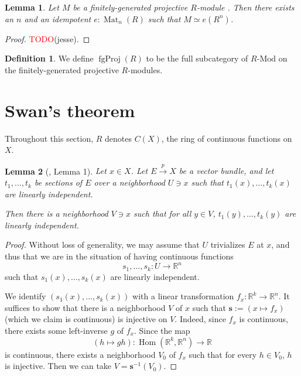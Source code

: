 \documentclass[11pt]{article}
\newcommand{\R}{\mathbb{R}}
\newcommand{\remph}[1]{\textcolor{red}{#1}}
\newcommand{\TODO}{\remph{TODO}}
\newcommand{\Hom}{\operatorname{Hom}}
\newcommand{\Mat}{\operatorname{Mat}}
\newcommand{\fgProj}{\operatorname{fgProj}}
\theoremstyle{plain}
\newtheorem{lemma}{Lemma}[section]
\theoremstyle{definition}
\newtheorem{definition}{Definition}[section]
\begin{document}
\begin{lemma} \label{lemma-fg-projective-idempotent}
  Let \(M\) be a finitely-generated projective \(R\)-module . Then there exists an \(n\) and an idempotent \(e : \Mat_n(R)\) such that \(M \simeq e(R^n)\).
\end{lemma}

\begin{proof}
  \TODO(jesse).
\end{proof}

\begin{definition} \label{def-category-projective-modules}
  We define \(\fgProj(R)\) to be the full subcategory of \(R\text{-Mod}\) on the finitely-generated projective \(R\)-modules.
\end{definition}

\section{Swan's theorem}

Throughout this section, \(R\) denotes \(C(X)\), the ring of continuous functions on \(X\).

\begin{lemma}[\cite{swan1962vector}, Lemma 1]\label{lemma-1}
  Let \(x \in X\). Let \(E \overset{p}{\to} X\) be a vector bundle, and let \(t_1, \dots, t_k\) be sections of \(E\) over a neighborhood \(U \ni x\) such that \(t_1(x), \dots, t_k(x)\) are linearly independent.

  Then there is a neighborhood \(V \ni x\) such that for all \(y \in V\), \(t_1(y), \dots, t_k(y)\) are linearly independent.
\end{lemma}

\begin{proof}
  Without loss of generality, we may assume that \(U\) trivializes \(E\) at \(x\), and thus that we are in the situation of having continuous functions
  \[s_1, \dots, s_k : U \to \R^n\]
  such that \(s_1(x), \dots, s_k(x)\) are linearly independent.
  
  We identify \((s_1(x), \dots, s_k(x))\) with a linear transformation \(f_x : \R^k \to \R^n\). It suffices to show that there is a neighborhood \(V\) of \(x\) such that \(\mathbf{s} := (x \mapsto f_x)\) (which we claim is continuous) is injective on \(V\). Indeed, since \(f_x\) is continuous, there exists some left-inverse \(g\) of \(f_x\). Since the map
  \[(h \mapsto gh) : \Hom(\R^k, \R^n) \to \R\]
  is continuous, there exists a neighborhood \(V_0\) of \(f_x\) such that for every \(h \in V_0\), \(h\) is injective. Then we can take \(V = \mathbf{s}^{-1}(V_0)\).
\end{proof}
\end{document}
